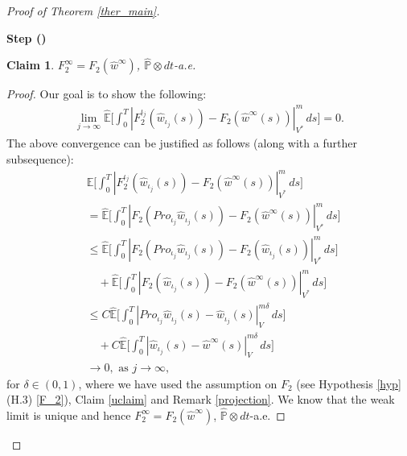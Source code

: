 \documentclass[english,a4paper,11pt]{amsart}
\theoremstyle{plain}
\newtheorem{claim}[theorem]{Claim}
\theoremstyle{definition}
\theoremstyle{remark}
\numberwithin{equation}{section}
\newcounter{lil1}
\newenvironment{step}
{\begin{list} { \bf Step (\Roman{lil1})}
		{ \usecounter{lil1}
			\setlength{\leftmargin}{0.0cm}
			\setlength{\topsep}{0.2cm}
			\setlength{\itemsep}{0.0cm}
			\setlength{\parsep}{0.1cm}
			\setlength{\itemindent}{0.8cm}
			\setlength{\parskip}{0.0cm}}}
	{\end{list}}
\newcounter{lil33}
\newcounter{lil1q}
\newcommand{\wh}{\widehat}
\newcommand{\PP}{{\mathbb{P}}}
\newcommand{\EE}{ \mathbb{E} }
\newcommand{\Pro}{Pro}
\begin{document}
\begin{proof}[Proof of Theorem \ref{ther_main}]
\begin{step}
\begin{claim}\label{F_2lim}
	$F_2^\infty=F_2(\wh{w}^\infty)$, $\wh{\PP}\otimes dt$-a.e.
\end{claim}
\begin{proof}
	  Our goal is to show the following: 
\begin{align*}
	\lim_{j\to\infty} \wh{\EE}\bigg[\int_0^T  | F_2^{\iota_j}(\wh{w}_{\iota_j}(s))-F_2(\wh{w}^\infty(s)) | _{V^\ast}^m\,ds\bigg]=0. 
\end{align*}
%
The above convergence can be justified as follows (along with a further subsequence):
%
\begin{align*}
&\wh{\EE}\bigg[\int_0^T  | F_2^{\iota_j}(\wh{w}_{\iota_j}(s))-F_2(\wh{w}^\infty(s)) | _{V^\ast}^m\,ds\bigg]\\&=
	\wh{\EE}\bigg[\int_0^T  | F_2(\Pro_{\iota_j}\wh{w}_{\iota_j}(s))-F_2(\wh{w}^\infty(s)) | _{V^\ast}^m\,ds\bigg]
\\&\leq  	\wh{\EE}\bigg[\int_0^T  | F_2(\Pro_{\iota_j}\wh{w}_{\iota_j}(s))-F_2(\wh{w}_{\iota_j}(s)) | _{V^\ast}^m\,ds\bigg]\\&\quad + \wh{\EE}\bigg[\int_0^T  | F_2(\wh{w}_{\iota_j}(s)) -F_2(\wh{w}^\infty(s)) | _{V^\ast}^m\,ds\bigg]
	\\& \leq 
	C \wh{\EE}\bigg[\int_0^T  | \Pro_{\iota_j}\wh{w}_{\iota_j}(s)-\wh{w}_{\iota_j}(s) | _V^{m\delta}\,ds\bigg]
	\\&\quad +C \wh{\EE}\bigg[\int_0^T  | \wh{w}_{\iota_j}(s) -\wh{w}^\infty(s) | _V^{m\delta}\,ds\bigg]
	\\& 
	\to 0, \text{ as } j\to \infty,
\end{align*}
%
for $\delta\in(0,1)$, where we have used the assumption on $F_2$ (see Hypothesis \ref{hyp} (H.3) \eqref{F_2}), Claim \ref{uclaim} and Remark \ref{projection}. We know that the weak limit is unique and hence $F_2^\infty=F_2(\wh{w}^\infty)$, $\wh{\PP}\otimes dt$-a.e.
\end{proof}


\end{step}
\end{proof}
\end{document}
